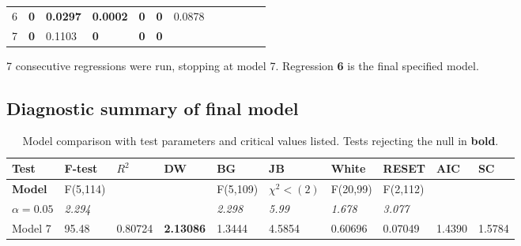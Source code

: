 \documentclass[12pt]{article}
\begin{document}
\begin{landscape}
\begin{table}[!htb]
\begin{tabularx}{\linewidth}{XXXXXXXXXXXX}
6                            & \textbf{0}                            & \textbf{0.0297}                     & \textbf{0.0002}                       & \textbf{0}                         & \textbf{0}                           & 0.0878                     &        &                            &                            &                            &                             \\
7                            & \textbf{0}                            & 0.1103                     & \textbf{0}                            & \textbf{0}                         & \textbf{0}                           &        &        &                            &                            &                            &                            
\end{tabularx}
\end{table}

7 consecutive regressions were run, stopping at model 7. Regression \textbf{6} is the final specified model.
\subsection{Diagnostic summary of final model} %
\label{sub:diagnosticsummfinal}

\begin{table}[!htb]
	\caption{Model comparison with test parameters and critical values listed. Tests rejecting the null in \textbf{bold}.}
\begin{tabularx}{\linewidth}{X|XXXXXXXXX}
\textbf{Test}               & F-test  & \(R^2\)   & DW         & BG  & JB  & White   & RESET  & AIC         & SC          \\\hline
  \textbf{Model}  &       F(5,114)          &             &                       &         F(5,109)                 &        \(\chi^2 < (2)\)                                &        F(20,99)         &     F(2,112)           &             &           \\
\textit{\(\alpha = 0.05\)} & \textit{2.294} &  &  & \textit{2.298}          & \textit{5.99}                          & \textit{1.678} & \textit{3.077} &  &  \\\hline\hline
Model 7                      & 95.48           & 0.80724    & \textbf{2.13086}               & 1.3444                  & 4.5854                                 & 0.60696          & 0.07049         & 1.4390      & 1.5784      \\
  
\end{tabularx}
\end{table} %

\end{landscape}
\end{document}
